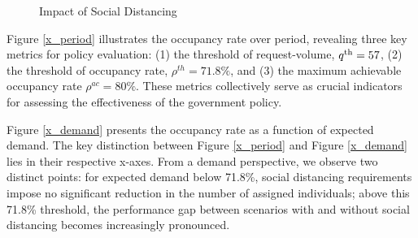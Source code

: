 \begin{figure}[h]
  \centering
      \caption{Impact of Social Distancing}\label{occupancy_rate_demand}
\end{figure}


Figure \ref{x_period} illustrates the occupancy rate over period, revealing three key metrics for policy evaluation: (1) the threshold of request-volume, ${q}^{\textup{th}} = 57$, (2) the threshold of occupancy rate, $\rho^{th} = 71.8\%$, and (3) the maximum achievable occupancy rate $\rho^{ac} =80\%$. These metrics collectively serve as crucial indicators for assessing the effectiveness of the government policy.





Figure \ref{x_demand} presents the occupancy rate as a function of expected demand. The key distinction between Figure \ref{x_period} and Figure \ref{x_demand} lies in their respective x-axes. From a demand perspective, we observe two distinct points: for expected demand below 71.8\%, social distancing requirements impose no significant reduction in the number of assigned individuals; above this 71.8\% threshold, the performance gap between scenarios with and without social distancing becomes increasingly pronounced.

